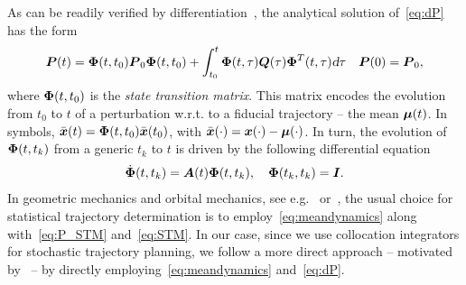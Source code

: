 As can be readily verified by differentiation~\cite{Gajic:LyapunovMatrixEquation:2010}, the analytical solution of~\eqref{eq:dP} has the form
\begin{align}\label{eq:P_STM}
\bP(t) = \bPhi(t,t_0) \bP_0 \bPhi(t,t_0)+\int_{t_0}^{t} \bPhi(t,\tau) \bQ(\tau) \bPhi^T(t,\tau) \dd \tau \quad \bP(0)=\bP_0,
\end{align}
where $\boldsymbol{\Phi}(t,t_0)$ is the \emph{state transition matrix}. This matrix encodes the evolution from $t_0$ to $t$ of a perturbation w.r.t. to a fiducial trajectory -- the mean $\boldsymbol{\mu}(t)$. In symbols, $\bar{\boldsymbol{x}}(t) = \boldsymbol{\Phi}(t,t_0) \bar{\boldsymbol{x}}(t_0)$, with $\bar{\boldsymbol{x}}(\cdot) =\boldsymbol{x}(\cdot) - \boldsymbol{\mu}(\cdot) $. In turn, the evolution of $\boldsymbol{\Phi}(t,t_k)$ from a generic $t_k$ to $t$ is driven by the following differential equation
\begin{align}\label{eq:STM}
\dbPhi(t,t_k) = \bA(t)\bPhi(t,t_k), \quad \bPhi(t_k, t_k) = \bI.
\end{align}
In geometric mechanics and orbital mechanics, see e.g.~\cite{Maruskin:DynamicalSystemsGeometric:2018} or~\cite{Tapley:StatisticalOrbitDetermination:2004}, the usual choice for statistical trajectory determination is to employ~\eqref{eq:meandynamics} along with~\eqref{eq:P_STM} and~\eqref{eq:STM}. In our case, since we use collocation integrators for stochastic trajectory planning, we follow a more direct approach -- motivated by~\cite{Gillis:PracticalMethodsApproximate:2015} -- by directly employing~\eqref{eq:meandynamics} and~\eqref{eq:dP}.

